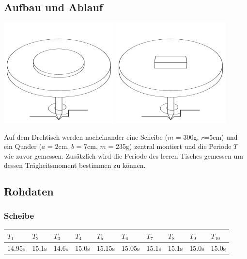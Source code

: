 \documentclass[12pt,a4paper]{article}
\begin{document}
\subsection*{Aufbau und Ablauf}
\begin{center}
\includegraphics[width=6cm]{illustration21.pdf}
\includegraphics[width=6cm]{illustration22.pdf}
\end{center}
Auf dem Drehtisch werden nacheinander eine Scheibe ($m$ = 300g, $r$=5cm) und ein Quader ($a$ = 2cm, $b$ = 7cm, $m$ = 235g) zentral montiert und die Periode $T$ wie zuvor gemessen. Zus\"atzlich wird die Periode des leeren Tisches gemessen um dessen Tr\"agheitsmoment bestimmen zu k\"onnen.

\subsection*{Rohdaten}
\subsubsection*{Scheibe}
\begin{tabular}{|l|l|l|l|l|l|l|l|l|l|}
\hline
$T_{1}$&$T_{2}$&$T_{3}$&$T_{4}$&$T_{5}$&$T_{6}$&$T_{7}$&$T_{8}$&$T_{9}$&$T_{10}$\\
\hline
14.95s&15.1s&14.6s&15.0s&15.15s&15.05s&15.1s&15.1s&15.0s&15.0s\\
\hline
\end{tabular}
\end{document}
